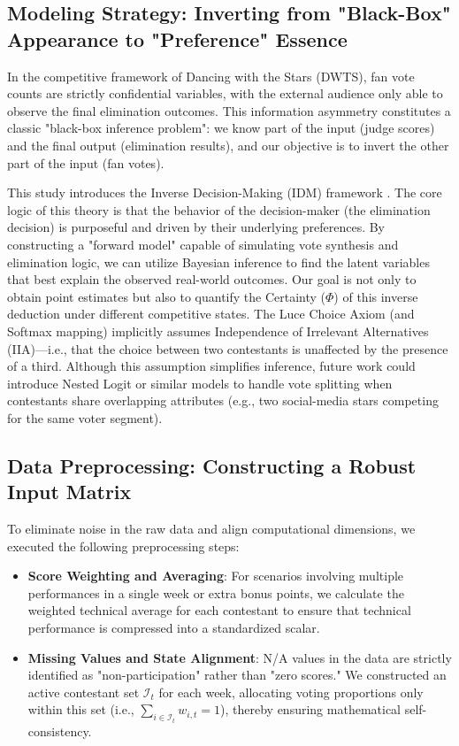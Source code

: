 \documentclass[12pt]{article}
\begin{document}
	\subsection{Modeling Strategy: Inverting from "Black-Box" Appearance to "Preference" Essence}
	In the competitive framework of Dancing with the Stars (DWTS), fan vote counts are strictly confidential variables, with the external audience only able to observe the final elimination outcomes. This information asymmetry constitutes a classic "black-box inference problem": we know part of the input (judge scores) and the final output (elimination results), and our objective is to invert the other part of the input (fan votes).
	
	This study introduces the Inverse Decision-Making (IDM) framework \cite{refAI}. The core logic of this theory is that the behavior of the decision-maker (the elimination decision) is purposeful and driven by their underlying preferences. By constructing a "forward model" capable of simulating vote synthesis and elimination logic, we can utilize Bayesian inference to find the latent variables that best explain the observed real-world outcomes. Our goal is not only to obtain point estimates but also to quantify the Certainty ($\Phi$) of this inverse deduction under different competitive states. The Luce Choice Axiom (and Softmax mapping) implicitly assumes Independence of Irrelevant Alternatives (IIA)—i.e., that the choice between two contestants is unaffected by the presence of a third. Although this assumption simplifies inference, future work could introduce Nested Logit or similar models to handle vote splitting when contestants share overlapping attributes (e.g., two social-media stars competing for the same voter segment).
	
	\subsection{Data Preprocessing: Constructing a Robust Input Matrix}
	To eliminate noise in the raw data and align computational dimensions, we executed the following preprocessing steps:
	\begin{itemize}
		\item \textbf{Score Weighting and Averaging}: For scenarios involving multiple performances in a single week or extra bonus points, we calculate the weighted technical average for each contestant to ensure that technical performance is compressed into a standardized scalar.
		\item \textbf{Missing Values and State Alignment}: N/A values in the data are strictly identified as "non-participation" rather than "zero scores." We constructed an active contestant set $\mathcal{I}_t$ for each week, allocating voting proportions only within this set (i.e., $\sum_{i \in \mathcal{I}_t} w_{i,t} = 1$), thereby ensuring mathematical self-consistency.
	\end{itemize}
	
\end{document}
